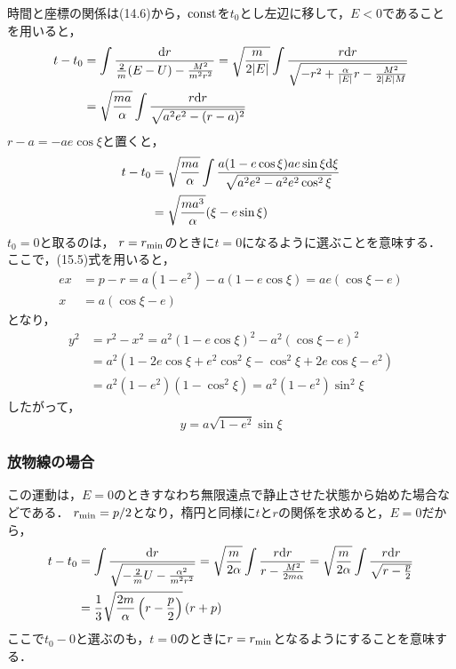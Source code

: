 \documentclass[12pt]{jsarticle}
\begin{document}
	時間と座標の関係は(14.6)から，${\rm const}$を$t_0$とし左辺に移して，$E<0$であることを用いると，
	\begin{align*}
	t-t_0 &= \int \frac{{\rm d}r}{\frac{2}{m}(E-U)-\frac{M^2}{m^2r^2}}
	= \sqrt{\frac{m}{2|E|}} \int
	\frac{r {\rm d}r}{\sqrt{-r^2 + \frac{\alpha}{|E|}r - \frac{M^2}{2|E|M}}} \\
	&= \sqrt{\frac{ma}{\alpha}} \int 
	\frac{r{\rm d}r}{\sqrt{a^2e^2 - (r-a)^2}}
	\end{align*}
	$r-a = -ae\cos{\xi}$と置くと，
	\begin{align*}
	t-t_0 &= \sqrt{\frac{ma}{\alpha}} \int
	\frac{a(1-e\cos{\xi})ae\sin{\xi}{\rm d}\xi}{\sqrt{a^2e^2 - a^2e^2 \cos^2{\xi}}} \\
	&= \sqrt{\frac{ma^3}{\alpha}}(\xi - e\sin{\xi})
	\end{align*}
	$t_0=0$と取るのは，
	$r = r_{\rm min}$のときに$t=0$になるように選ぶことを意味する．
	ここで，(15.5)式を用いると，
	\begin{align*}
	ex &= p - r = a(1-e^2) - a(1-e\cos{\xi}) = ae(\cos{\xi} - e) \\
	x &= a(\cos{\xi} - e)
	\end{align*}
	となり，
	\begin{align*}
	y^2 &= r^2 - x^2 = a^2(1-e\cos{\xi})^2 - a^2(\cos{\xi} - e)^2 \\
	&=a^2(1-2e\cos{\xi}+e^2\cos^2{\xi}-\cos^2{\xi}+2e\cos{\xi}-e^2) \\
	&= a^2(1-e^2)(1-\cos^2{\xi}) = a^2(1-e^2)\sin^2{\xi}
	\end{align*}
	したがって，
	\[
	y = a\sqrt{1-e^2}\sin{\xi}
	\]
	
	
	\subsubsection{放物線の場合}
	この運動は，$E=0$のときすなわち無限遠点で静止させた状態から始めた場合などである．
	$r_{\rm min} = p/2$となり，楕円と同様に$t$と$r$の関係を求めると，$E=0$だから，
	\begin{align*}
	t-t_0 &= \int \frac{{\rm d}r}{\sqrt{-\frac{2}{m}U-\frac{\alpha^2}{m^2r^2}}}
	= \sqrt{\frac{m}{2\alpha}} \int \frac{r{\rm d}r}{r-\frac{M^2}{2m\alpha}}
	= \sqrt{\frac{m}{2\alpha}} \int \frac{r{\rm d}r}{\sqrt{r-\frac{p}{2}}} \\
	&= \frac{1}{3}\sqrt{\frac{2m}{\alpha} \left(r-\frac{p}{2} \right)}
	\left( r + p \right)
	\end{align*}
	ここで$t_0-0$と選ぶのも，$t=0$のときに$r=r_{\rm min}$となるようにすることを意味する．
	
\end{document}

